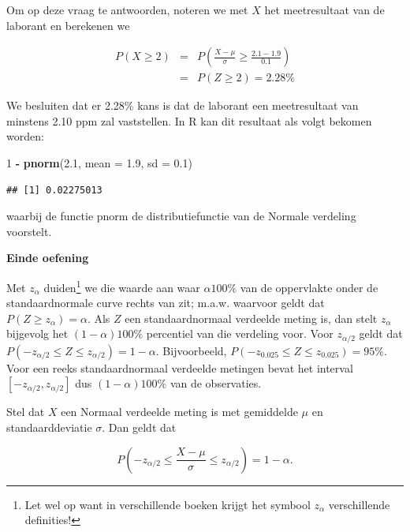 \documentclass[
  12pt,dutch]{book}
\newenvironment{Shaded}{\begin{snugshade}}{\end{snugshade}}
\newcommand{\AttributeTok}[1]{\textcolor[rgb]{0.13,0.29,0.53}{#1}}
\newcommand{\DecValTok}[1]{\textcolor[rgb]{0.00,0.00,0.81}{#1}}
\newcommand{\FloatTok}[1]{\textcolor[rgb]{0.00,0.00,0.81}{#1}}
\newcommand{\FunctionTok}[1]{\textcolor[rgb]{0.13,0.29,0.53}{\textbf{#1}}}
\newcommand{\NormalTok}[1]{#1}
\newcommand{\SpecialCharTok}[1]{\textcolor[rgb]{0.81,0.36,0.00}{\textbf{#1}}}
\theoremstyle{definition}
\theoremstyle{definition}
\theoremstyle{definition}
\theoremstyle{definition}
\theoremstyle{remark}
\begin{document}
Om op deze vraag te antwoorden, noteren we met \(X\) het meetresultaat van de
laborant en berekenen we

\begin{eqnarray*}
P(X\geq 2)&=&P\left(\frac{X-\mu}{\sigma}\geq \frac{2.1-1.9}{0.1}\right) \\
&=&P(Z\geq 2) = 2.28\%
\end{eqnarray*}

We besluiten dat er 2.28\% kans is dat de laborant een meetresultaat van
minstens 2.10 ppm zal vaststellen. In R kan dit resultaat als volgt bekomen worden:

\begin{Shaded}
\begin{Highlighting}[]
\DecValTok{1} \SpecialCharTok{{-}} \FunctionTok{pnorm}\NormalTok{(}\FloatTok{2.1}\NormalTok{, }\AttributeTok{mean =} \FloatTok{1.9}\NormalTok{, }\AttributeTok{sd =} \FloatTok{0.1}\NormalTok{)}
\end{Highlighting}
\end{Shaded}

\begin{verbatim}
## [1] 0.02275013
\end{verbatim}

waarbij de functie pnorm de distributiefunctie van de Normale verdeling voorstelt.

\textbf{Einde oefening}

Met \(z_{\alpha}\) duiden\footnote{Let wel op want in verschillende boeken krijgt het symbool \(z_{\alpha}\) verschillende definities!} we die waarde aan waar \(\alpha100\%\) van de
oppervlakte onder de standaardnormale curve rechts van zit; m.a.w. waarvoor
geldt dat \(P(Z \geq z_{\alpha}) = \alpha\). Als \(Z\) een standaardnormaal
verdeelde meting is, dan stelt \(z_{\alpha}\) bijgevolg het \((1-\alpha)100\%\)
percentiel van die verdeling voor. Voor \(z_{\alpha/2}\) geldt dat \(P(-z_{\alpha/2}\leq Z \leq z_{\alpha/2}) = 1-\alpha\). Bijvoorbeeld, \(P( -
z_{0.025}\leq Z \leq z_{0.025}) = 95\%\). Voor een reeks standaardnormaal
verdeelde metingen bevat het interval \([-z_{\alpha/2},z_{\alpha/2}]\) dus \((1-\alpha)100\%\) van de observaties.

Stel dat \(X\) een Normaal verdeelde meting is met gemiddelde \(\mu\) en
standaarddeviatie \(\sigma\). Dan geldt dat

\begin{equation*}
P\left( - z_{\alpha/2}\leq \frac{X - \mu}{\sigma} \leq z_{\alpha/2}\right) =
1-\alpha .
\end{equation*}
\end{document}
